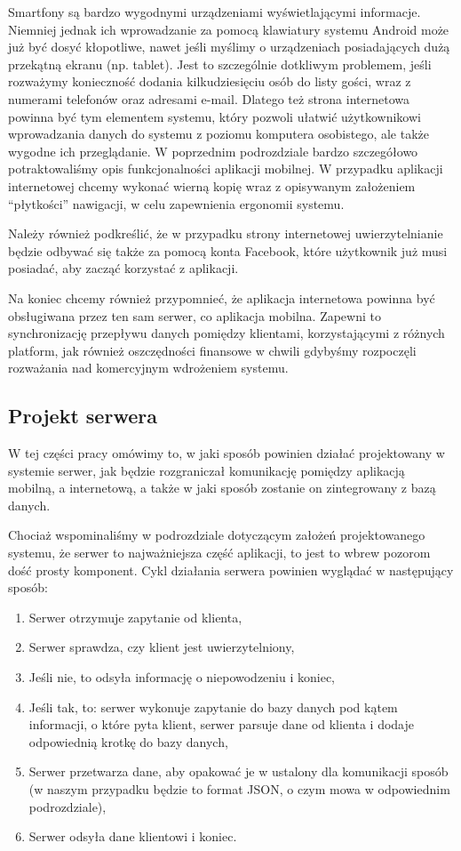 \documentclass[10pt,titlepage]{article}
\begin{document}
Smartfony są bardzo wygodnymi urządzeniami wyświetlającymi informacje. Niemniej jednak ich wprowadzanie za pomocą klawiatury systemu Android może już być dosyć kłopotliwe, 
nawet jeśli myślimy o urządzeniach posiadających dużą przekątną ekranu (np. tablet). Jest to szczególnie dotkliwym problemem, jeśli rozważymy konieczność dodania kilkudziesięciu 
osób do listy gości, wraz z numerami telefonów oraz adresami e-mail.
Dlatego też strona internetowa powinna być tym elementem systemu, który pozwoli ułatwić użytkownikowi wprowadzania danych do systemu z poziomu komputera osobistego, ale także wygodne
ich przeglądanie. W poprzednim podrozdziale bardzo szczegółowo potraktowaliśmy opis funkcjonalności aplikacji mobilnej. W przypadku aplikacji internetowej chcemy wykonać wierną kopię 
wraz z opisywanym założeniem ``płytkości'' nawigacji, w celu zapewnienia ergonomii systemu.

Należy również podkreślić, że w przypadku strony internetowej uwierzytelnianie będzie odbywać się także za pomocą konta Facebook, które użytkownik już musi posiadać, aby zacząć korzystać
z aplikacji.

Na koniec chcemy również przypomnieć, że aplikacja internetowa powinna być obsługiwana przez ten sam serwer, co aplikacja mobilna. Zapewni to synchronizację przepływu danych pomiędzy klientami,
korzystającymi z różnych platform, jak również oszczędności finansowe w chwili gdybyśmy rozpoczęli rozważania nad komercyjnym wdrożeniem systemu.

\subsection{Projekt serwera}
W tej części pracy omówimy to, w jaki sposób powinien działać projektowany w systemie serwer, jak będzie rozgraniczał komunikację pomiędzy aplikacją mobilną, a internetową, a także w jaki sposób
zostanie on zintegrowany z bazą danych.

Chociaż wspominaliśmy w podrozdziale dotyczącym założeń projektowanego systemu, że serwer to najważniejsza część aplikacji, to jest to wbrew pozorom dość prosty komponent.
Cykl działania serwera powinien wyglądać w następujący sposób:

\begin{enumerate}
 \item Serwer otrzymuje zapytanie od klienta,
 \item Serwer sprawdza, czy klient jest uwierzytelniony,
 \item Jeśli nie, to odsyła informację o niepowodzeniu i koniec,
 \item Jeśli tak, to:
  serwer wykonuje zapytanie do bazy danych pod kątem informacji, o które pyta klient,
  serwer parsuje dane od klienta i dodaje odpowiednią krotkę do bazy danych,
 \item Serwer przetwarza dane, aby opakować je w ustalony dla komunikacji sposób (w naszym przypadku będzie to format JSON, o czym mowa w odpowiednim podrozdziale),
 \item Serwer odsyła dane klientowi i koniec.
\end{enumerate}
\end{document}
